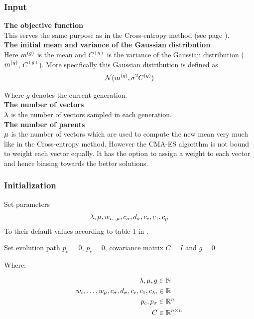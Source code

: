 \subsubsection{Input}

\textbf{The objective function} \\
This serves the same purpose as in the Cross-entropy method (see page \pageref{CEObjective}).
\\

\textbf{The initial mean and variance of the Gaussian distribution} \\
Here $m^{(g)}$ is the mean and  
${C^{(g)}}$ is the variance 
of the Gaussian distribution ($m^{(g)}$,
${C^{(g)}}$). 
More specifically this Gaussian distribution is defined as 
\begin{align}
\mathcal{N}(m^{(g)},\sigma^2 C^{(g)})
\end{align}

Where $g$ denotes the current generation.\\


\textbf{The number of vectors}\\
$\lambda$ is the number of vectors sampled in each generation.
\\

\textbf{The number of parents}\\
$\mu$ is the number of vectors which are used to compute 
the new mean very much like in the Cross-entropy method. However the CMA-ES algorithm
is not bound to weight each vector equally. It has the option to assign 
a weight to each vector and hence biasing towards the better solutions.
\\


\subsubsection{Initialization}


Set parameters
\begin{align}
\lambda, \mu, w_{i \dots \mu}, c_{\sigma}, d_{\sigma}, c_c, c_1, c_{\mu}
\end{align}
To their default values according to table 1 in \citep{hansen2011}.

Set evolution path $p_{\sigma} = 0$, $p_{c} = 0$, covariance matrix $C = I$ and $g = 0$

Where:

\begin{align}
\lambda, \mu, g &\in \mathbb{N}\\
w_i,\dots,w_{\mu}, c_{\sigma}, d_{\sigma}, c_c, c_1, c_{\lambda}, &\in \mathbb{R}\\
p_{c}, p_{\sigma} &\in \mathbb{R}^{n}\\
C &\in \mathbb{R}^{n \times n}
\end{align}

